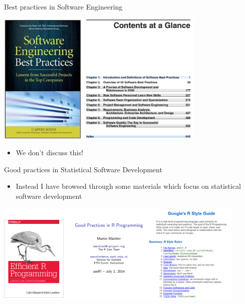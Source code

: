 \documentclass[ignorenonframetext,]{beamer}
\providecommand{\tightlist}{%
  \setlength{\itemsep}{0pt}\setlength{\parskip}{0pt}}
\begin{document}
\begin{frame}{%
\protect\hypertarget{best-practices-in-software-engineering}{%
Best practices in Software Engineering}}

\includegraphics[width=0.75\textwidth]{"images/bestPracticesSoftwareEngineering"}

\begin{itemize}
\tightlist
\item
  We don’t discuss this!
\end{itemize}

\end{frame}

\begin{frame}{%
\protect\hypertarget{good-practices-in-statistical-software-development-1}{%
Good practices in Statistical Software Development}}

\begin{itemize}
\tightlist
\item
  Instead I have browsed through some materials which focus on
  statistical software development
\end{itemize}

\begin{center}
\includegraphics[width=0.9\textwidth]{"images/oodPractices4RProgramming"}
\end{center}

\end{frame}
\end{document}
